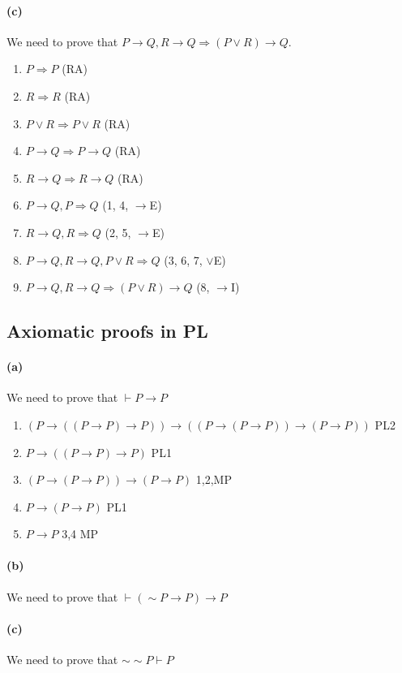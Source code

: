 \documentclass[sloppy, journal, git, bytitle]{humapap}
\begin{document}
\paragraph{(c)} We need to prove that $P\rightarrow Q, R\rightarrow Q \Rightarrow (P\vee R)\rightarrow Q$. 
\begin{enumerate}
	\item $P\Rightarrow P$ \hfil (RA)
	\item $R\Rightarrow R$ \hfil (RA)
	\item $P\vee R\Rightarrow P\vee R$ \hfil (RA)
	\item $P\rightarrow Q\Rightarrow P\rightarrow Q$ \hfil (RA)
	\item $R\rightarrow Q\Rightarrow R\rightarrow Q$ \hfil (RA)
	\item $P\rightarrow Q, P \Rightarrow Q$ \hfil (1, 4, $\rightarrow$E)
	\item $R\rightarrow Q, R \Rightarrow Q$ \hfil (2, 5, $\rightarrow$E)
	\item $P\rightarrow Q, R\rightarrow Q, P\vee R\Rightarrow Q$ \hfil (3, 6, 7, $\vee$E)
	\item $P\rightarrow Q, R\rightarrow Q\Rightarrow (P\vee R)\rightarrow Q$ \hfil (8, $\rightarrow$I)
\end{enumerate}

\subsection{Axiomatic proofs in PL}
\paragraph{(a)} We need to prove that $\vdash P\rightarrow P$
\begin{enumerate}
	\item $(P\rightarrow((P\rightarrow P)\rightarrow P))\rightarrow ((P\rightarrow(P\rightarrow P))\rightarrow(P\rightarrow P))$ \hfil PL2
	\item $P\rightarrow ((P\rightarrow P)\rightarrow P)$ \hfil PL1
	\item $(P\rightarrow (P\rightarrow P))\rightarrow(P\rightarrow P)$ \hfil 1,2,MP
	\item $P\rightarrow (P\rightarrow P)$ \hfil PL1
	\item $P\rightarrow P$ \hfil 3,4 MP
\end{enumerate}


\paragraph{(b)} We need to prove that $\vdash(\sim P\rightarrow P)\rightarrow P$
\paragraph{(c)} We need to prove that $\sim\sim P\vdash P$

\standardbib
\end{document}
